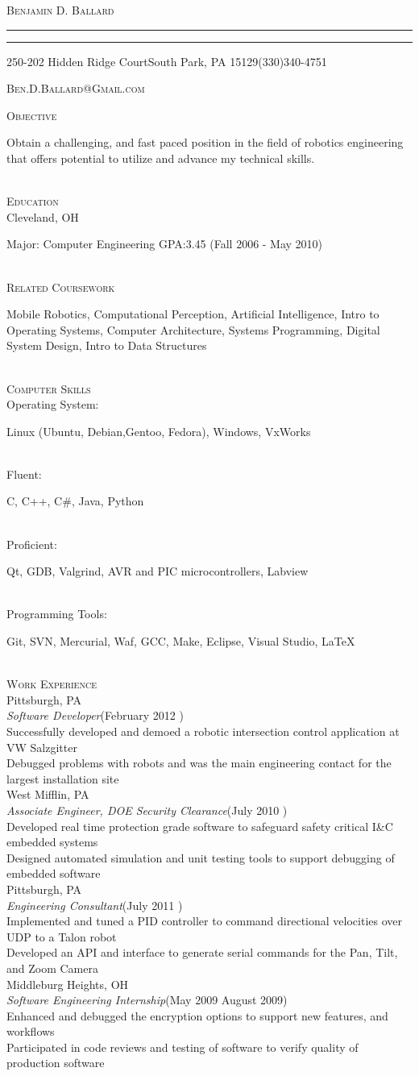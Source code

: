 \documentclass[11pt,letterpaper]{article}
\makeatletter
\newcommand{\name}{\textsc{Benjamin D. Ballard}}
\newcommand{\address}{\footnotesize 250-202 Hidden Ridge Court\hspace{2px}\textbullet\hspace{2px}South Park, PA 15129\hspace{2px}\textbullet\hspace{2px}(330)340-4751}
\newcommand{\email}{\textsc{Ben.D.Ballard@Gmail.com}}
\newcommand{\SkillItem}[2]{\hspace*{.5in}#1\hfill\begin{minipage}[t]{5.6in} #2 \end{minipage}\\}
\newcommand{\SectionHeader}[1]{\textsc{#1} \vspace{-2px}\\}
\newcommand{\CollegeHeader}[2]{\hspace*{.52in}{\bf#1} \hfill #2 \vspace{-3px} \\}
\newcommand{\CompanyHeader}[4]{\hspace*{.52in}{\bf#1} \hfill #2 \\\hspace*{.5in}\emph{#3}\hfill (#4) \vspace{-2px} \\}
\newcommand{\ResumeItem}[1]{\hspace*{.5in}\textopenbullet\hspace*{.2in}#1\\}
\newcommand{\TextBlock}[1]
{\hspace*{.5in} \begin{minipage}[t]{\textwidth -.5in} #1 \end{minipage}\\}
\newcommand{\ResumeHeader}{
\begin{center}
{

\linespread{0}

\Huge{\textsc{\name}}

\small
\nointerlineskip \vspace{4px}%
  \hspace{\fill}
\rule{\textwidth}{1px}
 \par\nointerlineskip \vspace{\baselineskip}
\nointerlineskip \vspace{0px}%
  \hspace{\fill}
\rule{\textwidth}{1px}
 \par \nointerlineskip \vspace{1px}
 \address \par \nointerlineskip \vspace{\baselineskip}
 \email
}
\end{center}
}
\makeatother
\begin{document}
\ResumeHeader
\vspace{-16px}

\SectionHeader{Objective}
\TextBlock{Obtain a challenging, and fast paced position in the field of robotics engineering that offers potential to utilize and advance my technical skills.}
\SectionHeader{Education}
\CollegeHeader{Case Western Reserve University}{Cleveland, OH}
\TextBlock{Major: Computer Engineering GPA:3.45 \hfill (Fall 2006 - May 2010)}
\SectionHeader{Related Coursework}
\TextBlock{Mobile Robotics, Computational Perception, Artificial Intelligence, Intro to Operating Systems, Computer Architecture, Systems Programming, Digital System Design, Intro to Data Structures}
\SectionHeader{Computer Skills}
\SkillItem{Operating System:}{Linux (Ubuntu, Debian,Gentoo, Fedora), Windows, VxWorks}
\SkillItem{Fluent:}{C, C++, C\#, Java, Python}
\SkillItem{Proficient:}{Qt, GDB, Valgrind, AVR and PIC microcontrollers, Labview}
\SkillItem{Programming Tools:}{Git, SVN, Mercurial, Waf, GCC, Make, Eclipse, Visual Studio, \LaTeX}
\SectionHeader{Work Experience}
\CompanyHeader{Seegrid}{Pittsburgh, PA}{Software Developer}{February 2012  \textendash { January 2013}}
\ResumeItem{Successfully developed and demoed a robotic intersection control application at VW Salzgitter }
\ResumeItem{Debugged problems with robots and was the main engineering contact for the largest installation site}
\CompanyHeader{Bechtel Marine Propulsion Company (Bettis Atomic Power Laboratory)}{West Mifflin, PA}{Associate Engineer, DOE Security Clearance}{July 2010 \textendash { February 2012}}
\ResumeItem{Developed real time protection grade software to safeguard safety critical I\&{C} embedded systems}
\ResumeItem{Designed automated simulation and unit testing tools to support debugging of embedded software}
\CompanyHeader{Carnegie Robotics}{Pittsburgh, PA}{Engineering Consultant}{July 2011 \textendash { August 2011}}
\ResumeItem{Implemented and tuned a PID controller to command directional velocities over UDP to a Talon robot}
\ResumeItem{Developed an API and interface to generate serial commands for the Pan, Tilt, and Zoom Camera}
\CompanyHeader{Codonics}{Middleburg Heights, OH}{Software Engineering Internship}{May 2009 \textendash
 { }August 2009}
 \ResumeItem{Enhanced and debugged the encryption options to support new features, and workflows}
 \ResumeItem{Participated in code reviews and testing of software to verify quality of production software}
\end{document}
